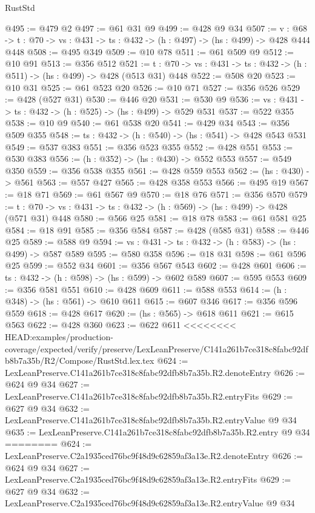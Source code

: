 \begin{lexlean}{RustStd}
\begin{coremodule}
{\begin{coremodule}
@495 := @479 @2
@497 := @61 @31 @9
@499 := @428 @9 @34
@507 := {v : @68} ->
  {t : @70} -> {vs : @431} -> {ts : @432} -> (h : @497) -> (hs : @499) -> @428 @444 @448
@508 := @495 @349
@509 := @10 @78
@511 := @61 @509 @9
@512 := @10 @91
@513 := @356 @512
@521 := {t : @70} -> {vs : @431} -> {ts : @432} -> (h : @511) -> (hs : @499) -> @428 (@513 @31) @448
@522 := @508 @20
@523 := @10 @31
@525 := @61 @523 @20
@526 := @10 @71
@527 := @356 @526
@529 := @428 (@527 @31)
@530 := @446 @20
@531 := @530 @9
@536 := {vs : @431} -> {ts : @432} -> (h : @525) -> (hs : @499) -> @529 @531
@537 := @522 @355
@538 := @10 @9
@540 := @61 @538 @20
@541 := @429 @34
@543 := @356 @509 @355
@548 := {ts : @432} -> (h : @540) -> (hs : @541) -> @428 @543 @531
@549 := @537 @383
@551 := @356 @523 @355
@552 := @428 @551
@553 := @530 @383
@556 := (h : @352) -> (hs : @430) -> @552 @553
@557 := @549 @350
@559 := @356 @538 @355
@561 := @428 @559 @553
@562 := (hs : @430) -> @561
@563 := @557 @427
@565 := @428 @358 @553
@566 := @495 @19
@567 := @18 @71
@569 := @61 @567 @9
@570 := @18 @76
@571 := @356 @570
@579 := {t : @70} -> {vs : @431} -> {ts : @432} -> (h : @569) -> (hs : @499) -> @428 (@571 @31) @448
@580 := @566 @25
@581 := @18 @78
@583 := @61 @581 @25
@584 := @18 @91
@585 := @356 @584
@587 := @428 (@585 @31)
@588 := @446 @25
@589 := @588 @9
@594 := {vs : @431} -> {ts : @432} -> (h : @583) -> (hs : @499) -> @587 @589
@595 := @580 @358
@596 := @18 @31
@598 := @61 @596 @25
@599 := @552 @34
@601 := @356 @567 @543
@602 := @428 @601
@606 := {ts : @432} -> (h : @598) -> (hs : @599) -> @602 @589
@607 := @595 @553
@609 := @356 @581 @551
@610 := @428 @609
@611 := @588 @553
@614 := (h : @348) -> (hs : @561) -> @610 @611
@615 := @607 @346
@617 := @356 @596 @559
@618 := @428 @617
@620 := (hs : @565) -> @618 @611
@621 := @615 @563
@622 := @428 @360
@623 := @622 @611
<<<<<<<< HEAD:examples/production-coverage/expected/verify/preserve/LexLeanPreserve/C141a261b7ce318c8fabc92dfb8b7a35b/R2/Compose/RustStd.lex.tex
@624 := LexLeanPreserve.C141a261b7ce318c8fabc92dfb8b7a35b.R2.denoteEntry
@626 := @624 @9 @34
@627 := LexLeanPreserve.C141a261b7ce318c8fabc92dfb8b7a35b.R2.entryFits
@629 := @627 @9 @34
@632 := LexLeanPreserve.C141a261b7ce318c8fabc92dfb8b7a35b.R2.entryValue @9 @34
@635 := LexLeanPreserve.C141a261b7ce318c8fabc92dfb8b7a35b.R2.entry @9 @34
========
@624 := LexLeanPreserve.C2a1935ced76bc9f48d9c62859af3a13e.R2.denoteEntry
@626 := @624 @9 @34
@627 := LexLeanPreserve.C2a1935ced76bc9f48d9c62859af3a13e.R2.entryFits
@629 := @627 @9 @34
@632 := LexLeanPreserve.C2a1935ced76bc9f48d9c62859af3a13e.R2.entryValue @9 @34

\end{coremodule}}
\end{coremodule}
\end{lexlean}
